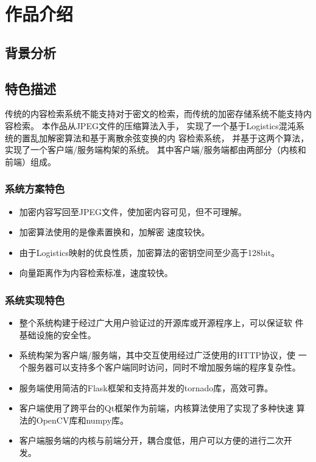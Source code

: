 
\chapter{作品介绍}
\label{chap:intro}

\section{背景分析}
\label{sec:bkg-analysis}

\section{特色描述}
\label{sec:spec-description}

传统的内容检索系统不能支持对于密文的检索，而传统的加密存储系统不能支持内容检索。
本作品从JPEG文件的压缩算法入手，
实现了一个基于Logistics混沌系统的置乱加解密算法和基于离散余弦变换的内
容检索系统，
并基于这两个算法，实现了一个客户端/服务端构架的系统。
其中客户端/服务端都由两部分（内核和前端）组成。

\subsection{系统方案特色}
\label{sec:sys-design-spec}
\begin{itemize}
\item 加密内容写回至JPEG文件，使加密内容可见，但不可理解。
\item 加密算法使用的是像素置换和，加解密  速度较快。
\item 由于Logistics映射的优良性质\cite{li2011}，加密算法的密钥空间至少高于128bit。
\item 向量距离作为内容检索标准，速度较快。
\end{itemize}

\subsection{系统实现特色}
\label{sec:sys-impl-spec}
\begin{itemize}
\item 整个系统构建于经过广大用户验证过的开源库或开源程序上，可以保证软
件基础设施的安全性。
\item 系统构架为客户端/服务端，其中交互使用经过广泛使用的HTTP协议，使
一个服务器可以支持多个客户端同时访问，同时不增加服务端的程序复杂性。
\item 服务端使用简洁的Flask框架和支持高并发的tornado库，高效可靠。
\item 客户端使用了跨平台的Qt框架作为前端，内核算法使用了实现了多种快速
算法的OpenCV库和numpy库。
\item 客户端服务端的内核与前端分开，耦合度低，用户可以方便的进行二次开
发。
\end{itemize}

